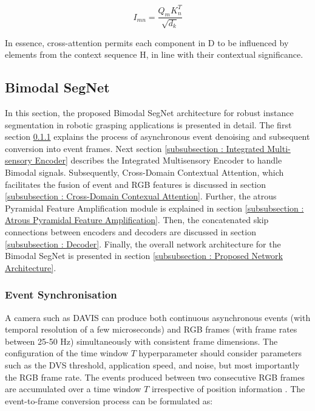 \documentclass[lettersize,journal]{IEEEtran}
\begin{document}
\begin{equation}
    I_{mn} = \frac{{Q_m K_n^T}}{{\sqrt{d_k}}}
\end{equation}

In essence, cross-attention permits each component in D to be influenced by elements from the context sequence H, in line with their contextual significance.
 








\subsection{\textbf{Bimodal SegNet}}

In this section, the proposed Bimodal SegNet architecture for robust instance segmentation in robotic grasping applications is presented in detail. The first section \ref{subsubsection : Event Synchronisation} explains the process of asynchronous event denoising and subsequent conversion into event frames. Next section \ref{subsubsection : Integrated Multi-sensory Encoder}  describes the Integrated Multisensory Encoder to handle Bimodal signals. Subsequently, Cross-Domain Contextual Attention, which facilitates the fusion of event and RGB features is discussed in section \ref{subsubsection : Cross-Domain Contexual Attention}. Further, the atrous Pyramidal Feature Amplification module is explained in section \ref{subsubsection : Atrous Pyramidal Feature Amplification}. Then, the concatenated skip connections between encoders and decoders are discussed in section \ref{subsubsection : Decoder}. Finally, the overall network architecture for the Bimodal SegNet is presented in section \ref{subsubsection : Proposed Network Architecture}. 



\subsubsection{\textbf{Event Synchronisation}}
\label{subsubsection : Event Synchronisation}

A camera such as DAVIS can produce both continuous asynchronous events  (with temporal resolution of a few microseconds) and RGB frames (with frame rates between 25-50 Hz) simultaneously with consistent frame dimensions.
The configuration of the time window $T$ hyperparameter should consider parameters such as the DVS threshold, application speed, and noise, but most importantly the RGB frame rate. The events produced between two consecutive RGB frames are accumulated over a time window $T$ irrespective of position information \cite{Naeini2020Dynamic-vision-basedNetworks}. The event-to-frame conversion process can be formulated as: 
\end{document}
